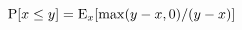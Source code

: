 \documentclass[14pt]{article}
\def\E{}
\renewcommand{\E}[2][]{\ensuremath\mathrm{E}_{#1}\!\left[#2\right]}
\def\PP{\ensuremath\mathrm{P}}
\begin{document}
\begin{equation}
    \PP[x\le y] = \E[x]{\max(y-x,0)/(y-x)}
\end{equation}
\end{document}
